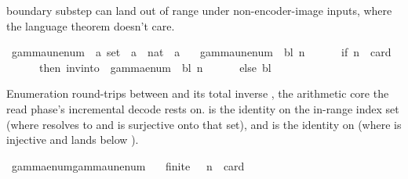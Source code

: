 \begin{isabellebody}
\begin{isamarkuptext}
  boundary substep can land out of range under
  non-encoder-image inputs, where the language theorem doesn't
  care.%
\end{isamarkuptext}\isamarkuptrue%
\isamarkupfalse%
\ gamma{\isacharunderscore}{\kern0pt}unenum\ {\isacharcolon}{\kern0pt}{\isacharcolon}{\kern0pt}\ {\isachardoublequoteopen}{\isacharprime}{\kern0pt}a\ set\ {\isasymRightarrow}\ {\isacharprime}{\kern0pt}a\ {\isasymRightarrow}\ nat\ {\isasymRightarrow}\ {\isacharprime}{\kern0pt}a{\isachardoublequoteclose}\ \isanewline
\ \ {\isachardoublequoteopen}gamma{\isacharunderscore}{\kern0pt}unenum\ {\isasymGamma}\ bl\ n\ {\isacharequal}{\kern0pt}\isanewline
\ \ \ \ \ {\isacharparenleft}{\kern0pt}if\ n\ {\isacharless}{\kern0pt}\ card\ {\isasymGamma}\isanewline
\ \ \ \ \ \ then\ inv{\isacharunderscore}{\kern0pt}into\ {\isasymGamma}\ {\isacharparenleft}{\kern0pt}gamma{\isacharunderscore}{\kern0pt}enum\ {\isasymGamma}\ bl{\isacharparenright}{\kern0pt}\ n\isanewline
\ \ \ \ \ \ else\ bl{\isacharparenright}{\kern0pt}{\isachardoublequoteclose}%
\begin{isamarkuptext}%
Enumeration round-trips between  and its
  total inverse , the arithmetic core the read
  phase's incremental decode rests on.   is the identity on the in-range index set
   (where  resolves
  to  and  is surjective onto that
  set), and  is the identity on
  \isa{{\isasymGamma}} (where  is injective and lands
  below ).%
\end{isamarkuptext}\isamarkuptrue%
\isamarkupfalse%
\ gamma{\isacharunderscore}{\kern0pt}enum{\isacharunderscore}{\kern0pt}gamma{\isacharunderscore}{\kern0pt}unenum{\isacharcolon}{\kern0pt}\isanewline
\ \ \ {\isachardoublequoteopen}finite\ {\isasymGamma}{\isachardoublequoteclose}\ \ {\isachardoublequoteopen}n\ {\isacharless}{\kern0pt}\ card\ {\isasymGamma}{\isachardoublequoteclose}\isanewline

\end{isabellebody}

